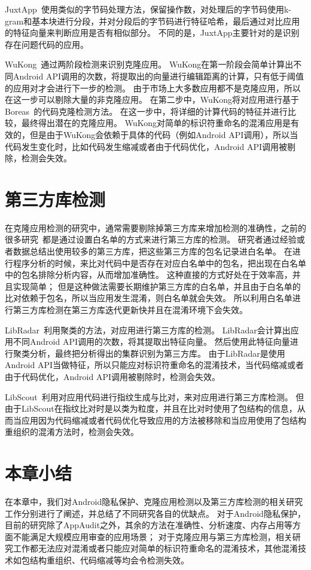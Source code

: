JuxtApp~\supercite{juxtapp}使用类似的字节码处理方法，保留操作数，对处理后的字节码使用k-gram和基本块进行分段，并对分段后的字节码进行特征哈希，最后通过对比应用的特征向量来判断应用是否有相似部分。
不同的是，JuxtApp主要针对的是识别存在问题代码的应用。

WuKong~\supercite{wukong}通过两阶段检测来识别克隆应用。
WuKong在第一阶段会简单计算出不同Android API调用的次数，将提取出的向量进行编辑距离的计算，只有低于阈值的应用对才会进行下一步的检测。
由于市场上大多数应用都不是克隆应用，所以在这一步可以剔除大量的非克隆应用。
在第二步中，WuKong将对应用进行基于Boreas~\supercite{boreas}的代码克隆检测方法。
在这一步中，将详细的计算代码的特征并进行比较，最终得出潜在的克隆应用。
WuKong对简单的标识符重命名的混淆应用是有效的，但是由于WuKong会依赖于具体的代码（例如Android API调用），所以当代码发生变化时，比如代码发生缩减或者由于代码优化，Android API调用被剔除，检测会失效。

\section{第三方库检测}
\label{sec:related:third-lib}

在克隆应用检测的研究中，通常需要剔除掉第三方库来增加检测的准确性，之前的很多研究~\supercite{grace2012unsafe,book2013longitudinal,chen2014achieving,stevens2012investigating,shekhar2012adsplit}都是通过设置白名单的方式来进行第三方库的检测。
研究者通过经验或者数据总结出使用较多的第三方库，把这些第三方库的包名记录进白名单。
在进行程序分析的时候，来比对代码中是否存在对应白名单中的包名，把出现在白名单中的包名排除分析内容，从而增加准确性。
这种直接的方式好处在于效率高，并且实现简单；
但是这种做法需要长期维护第三方库的白名单，并且由于白名单的比对依赖于包名，所以当应用发生混淆，则白名单就会失效。
所以利用白名单进行第三方库检测在第三方库迭代更新快并且在混淆环境下会失效。

LibRadar~\supercite{libradar}利用聚类的方法，对应用进行第三方库的检测。
LibRadar会计算出应用不同Android API调用的次数，将其提取出特征向量。
然后使用此特征向量进行聚类分析，最终把分析得出的集群识别为第三方库。
由于LibRadar是使用Android API当做特征，所以只能应对标识符重命名的混淆技术，当代码缩减或者由于代码优化，Android API调用被剔除时，检测会失效。

LibScout~\supercite{libscout}利用对应用代码进行指纹生成与比对，来对应用进行第三方库检测。
但由于LibScout在指纹比对时是以类为粒度，并且在比对时使用了包结构的信息，从而当应用因为代码缩减或者代码优化导致应用的方法被移除和当应用使用了包结构重组织的混淆方法时，检测会失效。

\section{本章小结}
\label{sec:related:conclusion}

在本章中，我们对Android隐私保护、克隆应用检测以及第三方库检测的相关研究工作分别进行了阐述，并总结了不同研究各自的优缺点。
对于Android隐私保护，目前的研究除了AppAudit之外，其余的方法在准确性、分析速度、内存占用等方面不能满足大规模应用审查的应用场景；
对于克隆应用与第三方库检测，相关研究工作都无法应对混淆或者只能应对简单的标识符重命名的混淆技术，其他混淆技术如包结构重组织、代码缩减等均会令检测失效。